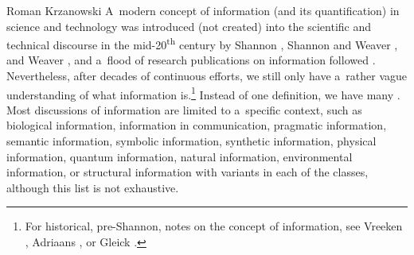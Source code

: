 \begin{artengenv}{Roman Krzanowski}
\lettrine[loversize=0.13,lines=2,lraise=-0.03,nindent=0em,findent=0.2pt]%
{A}{}~modern concept of information (and its quantification) in science and technology was introduced (not created) into the scientific and technical discourse in the mid-20\textsuperscript{th} century by Shannon 
\parencite*[][]{shannon_mathematical_1948}, %
 Shannon and Weaver 
\parencites*[][]{ShannonWeaver1949}[][]{ShannonWeaver1998}, %
 and Weaver 
\parencite*[][]{weaver_mathematics_1949}, %
 and a~flood of research publications on information followed 
\parencite[e.g][]{carvalho_60_2009}. %
 Nevertheless, after decades of continuous efforts, we still only have a~rather vague understanding of what information is.\footnote{For historical, pre-Shannon, notes on the concept of information, see Vreeken 
\parencite*[][]{vreeken_history_2005}, %
 Adriaans 
\parencite*[][]{adriaans_information_2020}, %
 or Gleick 
\parencite*[][]{gleick_information_2011}.%
} Instead of one definition, we have many 
\parencites[e.g][]{adriaans_information_2020}[][]{krzanowski_ontological_2022}. %
 Most discussions of information are limited to a~specific context, such as biological information, information in communication, pragmatic information, semantic information, symbolic information, synthetic information, physical information, quantum information, natural information, environmental information, or structural information with variants in each of the classes, although this list is not exhaustive.




\end{artengenv}

